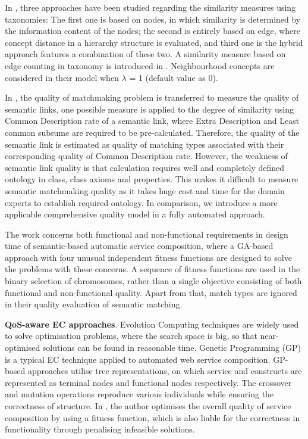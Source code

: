 \documentclass{IEEEtran}
\begin{document}
In \cite{shet2012new}, three approaches have been studied regarding the similarity measures using taxonomies: The first one is based on nodes, in which similarity is determined by the information content of the nodes; the second is entirely based on edge, where concept distance in a hierarchy structure is evaluated, and third one is the hybrid approach features a combination of these two. A similarity measure based on edge counting in taxonomy is introduced in \cite{shet2012new}. Neighbourhood concepts are considered in their model when $\lambda$ = 1 (default value as 0).

In \cite{lecue2009optimizing}, the quality of matchmaking problem is transferred to measure the quality of semantic links, one possible measure is applied to the degree of similarity using Common Description rate of a semantic link, where Extra Description and Least common subsume are required to be pre-calculated. Therefore, the quality of the semantic link is estimated as quality of matching types associated with their corresponding quality of Common Description rate. However, the weakness of semantic link quality is that calculation requires well and completely defined ontology in class, class axioms and properties. This makes it difficult to measure semantic matchmaking quality as it takes huge cost and time for the domain experts to establish required ontology. In comparison, we introduce a more applicable comprehensive quality model in a fully automated approach.

The work \cite{fanjiang2014semantic} concerns both functional and non-functional requirements in design time of semantic-based automatic service composition, where a GA-based approach with four unusual independent fitness functions are designed to solve the problems with these concerns. A sequence of fitness functions are used in the binary selection of chromosomes, rather than a single objective consisting of both functional and non-functional quality. Apart from that, match types are ignored in their quality evaluation of semantic matching.

\textbf{QoS-aware EC approaches}. Evolution Computing techniques are widely used to solve optimisation problems, where the search space is big, so that near-optimised solutions can be found in reasonable time. Genetic Programming (GP) \cite{da2016particle,da2015graphevol} is a typical EC technique applied to automated web service composition. GP-based approaches utilise tree representations, on which service and constructs are represented as terminal nodes and functional nodes respectively. The crossover and mutation operations reproduce various individuals while ensuring the correctness of structure. In \cite{yu2013adaptive}, the author optimises the overall quality of service composition by using a fitness function, which is also liable for the correctness in functionality through penalising infeasible solutions. 
\end{document}
